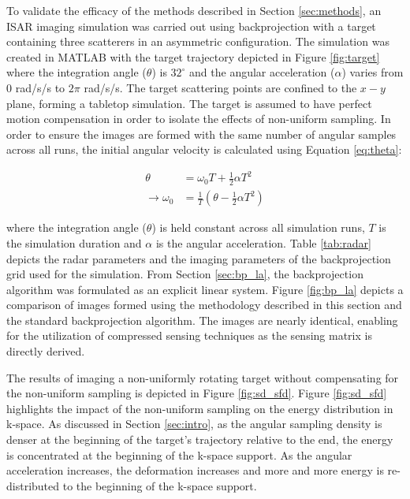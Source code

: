 \documentclass[conference]{IEEEtran}
\begin{document}
To validate the efficacy of the methods described in Section \ref{sec:methods}, an ISAR imaging simulation was carried out using backprojection with a target containing three scatterers in an asymmetric configuration. The simulation was created in MATLAB with the target trajectory depicted in Figure \ref{fig:target} where the integration angle ($\theta$) is $32^{\circ}$ and the angular acceleration ($\alpha$) varies from $0$ rad/s/s to $2\pi$ rad/s/s. The target scattering points are confined to the $x-y$ plane, forming a tabletop simulation. The target is assumed to have perfect motion compensation in order to isolate the effects of non-uniform sampling. In order to ensure the images are formed with the same number of angular samples across all runs, the initial angular velocity is calculated using Equation \ref{eq:theta}:

\begin{equation}
    \begin{aligned}
        \theta &= \omega_{0} T + \frac{1}{2}\alpha T^{2} \\
        \rightarrow \omega_{0} &= \frac{1}{T} \left( \theta - \frac{1}{2}\alpha T^{2} \right)
    \label{eq:theta}
    \end{aligned}
\end{equation}

\noindent where the integration angle ($\theta$) is held constant across all simulation runs, $T$ is the simulation duration and $\alpha$ is the angular acceleration. Table \ref{tab:radar} depicts the radar parameters and the imaging parameters of the backprojection grid used for the simulation. From Section \ref{sec:bp_la}, the backprojection algorithm was formulated as an explicit linear system. Figure \ref{fig:bp_la} depicts a comparison of images formed using the methodology described in this section and the standard backprojection algorithm. The images are nearly identical, enabling for the utilization of compressed sensing techniques as the sensing matrix is directly derived. 

The results of imaging a non-uniformly rotating target without compensating for the non-uniform sampling is depicted in Figure \ref{fig:sd_sfd}. Figure \ref{fig:sd_sfd} highlights the impact of the non-uniform sampling on the energy distribution in k-space. As discussed in Section \ref{sec:intro}, as the angular sampling density is denser at the beginning of the target's trajectory relative to the end, the energy is concentrated at the beginning of the k-space support. As the angular acceleration increases, the deformation increases and more and more energy is re-distributed to the beginning of the k-space support. 
\end{document}
